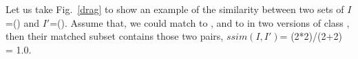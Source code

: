 
Let us take Fig.~\ref{drag} to show an example of the similarity
between two sets of $I$=() and
$I'$=(). Assume that, we could match
 to , and  to
 in two versions of class , then
their matched subset contains those two pairs, $ssim(I,I')$=
(2*2)/(2+2) = 1.0.




